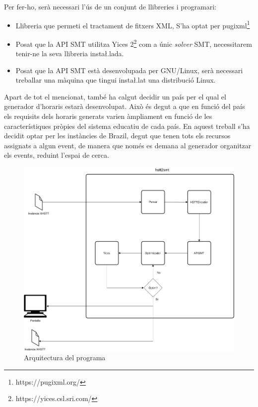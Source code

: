 \documentclass[11pt,a4paper,twoside]{report}
\begin{document}
  Per fer-ho, serà necessari l'ús de un conjunt de llibreries i programari:

  \begin{itemize}
    \item Llibreria que permeti el tractament de fitxers XML, S'ha optat per pugixml\footnote{https://pugixml.org/}
    \item Posat que la API SMT utilitza Yices 2\footnote{https://yices.csl.sri.com/} com a únic \textit{solver} SMT, necessitarem tenir-ne la seva llibreria insta\l.lada.
    \item Posat que la API SMT està desenvolupada per GNU/Linux, serà necessari treballar una màquina que tingui insta\l.lat una distribució Linux.
  \end{itemize}
  
  Apart de tot el mencionat, també ha calgut decidir un país per el qual el generador d'horaris estarà desenvolupat. Això és degut a que en funció del país els requisits dels horaris generats varien àmpliament en funció de les característiques pròpies del sistema educatiu de cada país.
  En aquest treball s'ha decidit optar per les instàncies de Brazil, degut que tenen tots els recursos assignats a algun event, de manera que només es demana al generador organitzar els events, reduint l'espai de cerca.
 
 \begin{figure}[ht!]
  \includegraphics[width=\textwidth]{Diagrames/Arqui1.png}
  \caption{Arquitectura del programa}
  \label{fig:Arqui1}
\end{figure}
 
\end{document}
